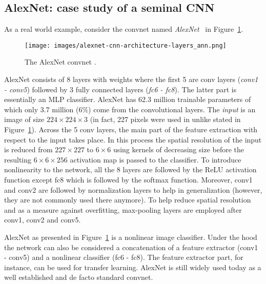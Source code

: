 \documentclass[a4paper,12pt]{report}
\begin{document}
\subsection{AlexNet: case study of a seminal CNN}\label{subsubsec:alexnet}
As a real world example, consider the convnet named \textit{AlexNet}~\cite{AlexNet} in Figure~\ref{fig:AlexNet}.
\begin{figure}[ht]
\centering
\texttt{[image: images/alexnet-cnn-architecture-layers\_ann.png]}
\caption{The AlexNet convnet \cite{AlexNet}.}
\label{fig:AlexNet}
\end{figure}
AlexNet consists of 8 layers with weights where the first 5 are conv layers (\textit{conv1 - conv5}) followed by 3 fully connected layers (\textit{fc6 - fc8}). The latter part is essentially an MLP classifier. AlexNet has 62.3 million trainable parameters of which only 3.7 million (6\%) come from the convolutional layers. The \textit{input} is an image of size $224 \times 224 \times 3$ (in fact, 227 pixels were used in \cite{AlexNet} unlike stated in Figure~\ref{fig:AlexNet}). Across the 5 conv layers, the main part of the feature extraction with respect to the input takes place. In this process the spatial resolution of the input is reduced from $227 \times 227$ to $6 \times 6$ using kernels of decreasing size before the resulting $6 \times 6 \times 256$ activation map is passed to the classifier. To introduce nonlinearity to the network, all the 8 layers are followed by the ReLU activation function except fc8 which is followed by the softmax function. Moreover, conv1 and conv2 are followed by normalization layers to help in generalization (however, they are not commonly used there anymore). To help reduce spatial resolution and as a measure against overfitting, max-pooling layers are employed after conv1, conv2 and conv5. 

AlexNet as presented in Figure~\ref{fig:AlexNet} is a nonlinear image classifier. Under the hood the network can also be considered a concatenation of a feature extractor (conv1 - conv5) and a nonlinear classifier (fc6 - fc8). The feature extractor part, for instance, can be used for transfer learning. AlexNet is still widely used today as a well established and de facto standard convnet.
\end{document}
